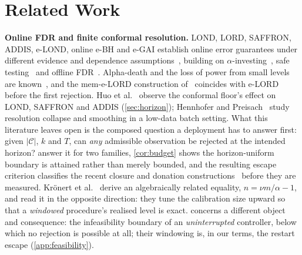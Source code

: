 \documentclass[conference]{IEEEtran}
\newcommand{\Cal}{\mathcal{C}}
\newcommand{\nCal}{\lvert\Cal\rvert}
\begin{document}
\section{Related Work}\label{sec:related}

\textbf{Online FDR and finite conformal resolution.} LOND, LORD, SAFFRON, ADDIS, e-LOND, online e-BH and
e-GAI establish online error guarantees under different evidence and dependence
assumptions~\cite{javanmard2015lond,javanmard2018lord,ramdas2017lordpp,ramdas2018saffron,tian2019addis,xu2024elond,wang2022evaluebh,fischer2025onlineebh,egai2025},
building on $\alpha$-investing~\cite{foster2008alpha}, safe testing~\cite{grunwald2024safe} and offline
FDR~\cite{benjamini1995controlling}. Alpha-death and the loss of power from small levels are
known~\cite{ramdas2017lordpp,foster2008alpha}, and the mem-e-LORD construction of~\cite{egai2025}
coincides with e-LORD before the first rejection. Huo et al.~\cite{huo2024realtime} observe the conformal floor's effect on LOND, SAFFRON and ADDIS
(\cref{sec:horizon});
Hennhofer and Preisach~\cite{hennhofer2026resolution} study resolution collapse and smoothing in a
low-data batch setting. What this literature leaves open is the composed question a deployment has to
answer first: given $\nCal$, $k$ and $T$, can \emph{any} admissible observation be rejected at the
intended horizon?  answer it for two families, \cref{cor:budget} shows the
horizon-uniform boundary is attained rather than merely bounded, and the resulting escape criterion
classifies the recent closure and donation constructions~\cite{xu2026eclosure,xu2025closure} before they
are measured. Kr\"onert et al.~\cite{kronert2024fdr} derive an algebraically related equality, $n=\nu m/\alpha-1$,
and read it in the opposite direction: they tune the calibration size upward so that a \emph{windowed}
procedure's realised level is exact.  concerns a different object and consequence: the
infeasibility boundary of an \emph{uninterrupted} controller, below which no rejection is possible at
all; their windowing is, in our terms, the restart escape
(\cref{app:feasibility}).
\end{document}
